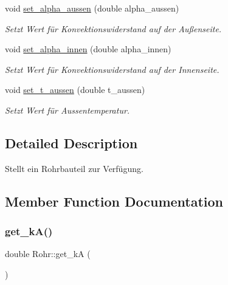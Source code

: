 \begin{DoxyCompactItemize}
\mbox{\label{class_rohr_ae6e604082fdb43a35bcdc74478ced8a7}} 
void \hyperlink{class_rohr_ae6e604082fdb43a35bcdc74478ced8a7}{set\+\_\+alpha\+\_\+aussen} (double alpha\+\_\+aussen)
\begin{DoxyCompactList}\small\item\em Setzt Wert für Konvektionswiderstand auf der Außenseite. \end{DoxyCompactList}\item 
\mbox{\label{class_rohr_aed25a50fcf5c735e51693303d8b41663}} 
void \hyperlink{class_rohr_aed25a50fcf5c735e51693303d8b41663}{set\+\_\+alpha\+\_\+innen} (double alpha\+\_\+innen)
\begin{DoxyCompactList}\small\item\em Setzt Wert für Konvektionswiderstand auf der Innenseite. \end{DoxyCompactList}\item 
\mbox{\label{class_rohr_a92be37f04575328b6b15de5ab2e511a9}} 
void \hyperlink{class_rohr_a92be37f04575328b6b15de5ab2e511a9}{set\+\_\+t\+\_\+aussen} (double t\+\_\+aussen)
\begin{DoxyCompactList}\small\item\em Setzt Wert für Aussentemperatur. \end{DoxyCompactList}\end{DoxyCompactItemize}


\subsection{Detailed Description}
Stellt ein Rohrbauteil zur Verfügung. 

\subsection{Member Function Documentation}
\mbox{\label{class_rohr_a29a212b5ffe5723b3c2fe02aba0804c0}} 
\subsubsection{\texorpdfstring{get\+\_\+k\+A()}{get\_kA()}\hspace{0.1cm}{\footnotesize\ttfamily [1/2]}}
{\footnotesize\ttfamily double Rohr\+::get\+\_\+kA (\begin{DoxyParamCaption}{ }\end{DoxyParamCaption})}



